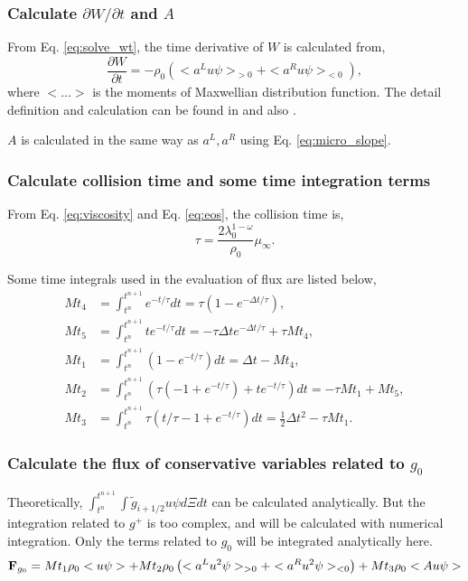\documentclass[a4paper]{book}
\begin{document}
\subsubsection*{Calculate ${\partial W}/{\partial t}$ and $A$}
From Eq. \ref{eq:solve_wt}, the time derivative of $W$ is calculated from,
$$\frac{\partial W}{\partial t}=-\rho_0\left(<a^Lu\psi>_{>0}+<a^Ru\psi>_{<0}\right),$$
where $<...>$ is the moments of Maxwellian distribution function. The detail definition and calculation can be found in \cite{Xu2001} and also .

$A$ is calculated in the same way as $a^L,a^R$ using Eq. \ref{eq:micro_slope}.

\subsubsection*{Calculate collision time and some time integration terms}
From Eq. \ref{eq:viscosity} and Eq. \ref{eq:eos}, the collision time is,
$$\tau = \frac{2\lambda_0^{1-\omega}}{\rho_0}\mu_{\infty}.$$

Some time integrals used in the evaluation of flux are listed below,
$$
\begin{aligned}
    Mt_4 &= \int_{t^n}^{t^{n+1}} e^{-t/\tau}dt = \tau(1-e^{-\Delta t/\tau}), \\
    Mt_5 &= \int_{t^n}^{t^{n+1}} te^{-t/\tau}dt = -\tau\Delta t e^{-\Delta t/\tau}+\tau Mt_4, \\
    Mt_1 &= \int_{t^n}^{t^{n+1}} (1-e^{-t/\tau})dt = \Delta t-Mt_4, \\
    Mt_2 &= \int_{t^n}^{t^{n+1}} (\tau(-1+e^{-t/\tau})+te^{-t/\tau})dt = -\tau Mt_1+Mt_5, \\
    Mt_3 &= \int_{t^n}^{t^{n+1}} \tau(t/\tau-1+e^{-t/\tau})dt = \frac{1}{2}\Delta t^2-\tau Mt_1.
\end{aligned} 
$$

\subsubsection*{Calculate the flux of conservative variables related to $g_0$}
Theoretically, $\int_{t^n}^{t^{n+1}}\int {\tilde g}_{i+1/2}u\psi d\Xi dt$ can be calculated analytically. But the integration related to $g^+$ is too complex, and will be calculated with numerical integration. Only the terms related to $g_0$ will be integrated analytically here.
$${\bf F}_{g_0} = Mt_1\rho_0<u\psi>+Mt_2\rho_0\left(<a^Lu^2\psi>_{>0}+<a^Ru^2\psi>_{<0}\right)+Mt_3\rho_0<Au\psi>$$
\end{document}
